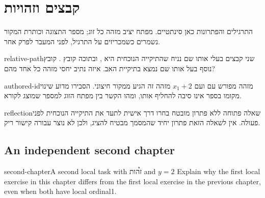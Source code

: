 \def\lakitdocumentclass{report}
\def\lakitclassoptions{11pt,a4paper}
\def\lakitgeometryoptions{margin=2.3cm,headheight=14pt}
\def\lakitlinespread{1.12}
\def\lakitparagraphstyle{block}
\def\lakitlanguageprofile{hebrew-with-english}




\chapter{קבצים וזהויות}
התרגילים והפתרונות כאן סינתטיים. מפתח יציב מזהה כל זוג; מספר התצוגה
וכותרת המקור נשמרים כשמכריזים על התרגיל, לפני המעבר לפרק אחר.
\begin{studyexercise}{relative-path}{שני קבצים בעלי אותו שם}
נניח שהתיקייה הנוכחית היא , ובתוכה קובץ .
קובץ נוסף בעל אותו שם נמצא בתיקיית האב. איזה נתיב יחסי מזהה כל אחד מהם?
\end{studyexercise}
\begin{studyexercise}[id={07-1}]{authored-id}{מזהה מפורש עם  ועם $x_1+2$}
מזהה זה הגיע ממקור חיצוני. הסבירו מדוע שינוי מקומו בספר אינו סיבה
להחליף אותו, ומהו הקשר בין מפתח הזוג למספר שמוצג לקורא.
\end{studyexercise}
\begin{studyexercise}[solution=false]{reflection}{שאלה פתוחה ללא פתרון מובטח}
בחרו דרך אישית לתעד את התיקייה הנוכחית לפני פעולה. אין לשאלה הזאת
פתרון יחיד שהמסמך מבטיח להציג, ולכן לא נוצר עבורה קישור ריק.
\end{studyexercise}
\begin{englishprose}
\chapter{An independent second chapter}
\begin{studyexercise}{second-chapter}{A second local task with \h{זהות} and $y=2$}
Explain why the first local exercise in this chapter differs from the first
local exercise in the previous chapter, even when both have local ordinal1.
\end{studyexercise}
\end{englishprose}
